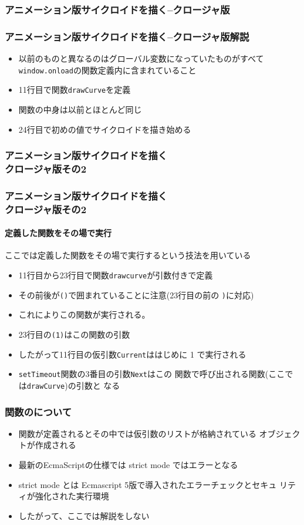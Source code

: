 \begin{frame}[containsverbatim]
 \frametitle{アニメーション版サイクロイドを描く--クロージャ版}
\end{frame}
\begin{frame}[containsverbatim]
 \frametitle{アニメーション版サイクロイドを描く--クロージャ版解説}
 \begin{itemize}
	\item 以前のものと異なるのはグローバル変数になっていたものがすべて
				\Verb+window.onload+の関数定義内に含まれていること
	\item 11行目で関数\Verb+drawCurve+を定義
	\item 関数の中身は以前とほとんど同じ
	\item 24行目で初めの値でサイクロイドを描き始める
 \end{itemize}
\end{frame}
\begin{frame}[containsverbatim]
 \frametitle{アニメーション版サイクロイドを描く\\クロージャ版その2}
\end{frame}
\begin{frame}[containsverbatim]
 \frametitle{アニメーション版サイクロイドを描く\\クロージャ版その2}
 \framesubtitle{定義した関数をその場で実行}
 ここでは定義した関数をその場で実行するという技法を用いている
 \begin{itemize}
	\item 11行目から23行目で関数\texttt{drawcurve}が引数付きで定義
	\item その前後が\Verb+()+で囲まれていることに注意(23行目の前の
				\texttt{)}に対応)
	\item これによりこの関数が実行される。
	\item 23行目の\Verb+(1)+はこの関数の引数
	\item したがって11行目の仮引数\Verb+Current+ははじめに 1 で実行される
	\item \Verb+setTimeout+関数の3番目の引数\Verb+Next+はこの%
				関数で呼び出される関数(ここでは\Verb+drawCurve+)の引数と
				なる
 \end{itemize}
\end{frame}
\begin{frame}[containsverbatim]
 \frametitle{関数のについて}
 \begin{itemize}
	\item 関数が定義されるとその中では仮引数のリストが格納されている
				オブジェクトが作成される
	\item 最新のEcmaScriptの仕様では strict mode ではエラーとなる
	\item strict mode とは Ecmascript 5版で導入されたエラーチェックとセキュ
				リティが強化された実行環境
	\item したがって、ここでは解説をしない
 \end{itemize}
\end{frame}
